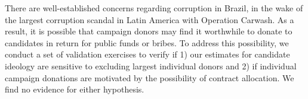 \documentclass[12pt,english]{article}
\newcommand{\lyxdot}{.}
\numberwithin{equation}{section}
\theoremstyle{plain}
\theoremstyle{remark}
\theoremstyle{plain}
\newcommand{\red}[1]{\textcolor{red}{#1}}
\begin{document}




There are well-established concerns regarding corruption in Brazil, in the wake of the largest corruption scandal in Latin America with Operation Carwash. As a result, it is possible that campaign donors may find it worthwhile to donate to candidates in return for public funds or bribes. To address this possibility, we conduct a set of validation exercises to verify if 1) our estimates for candidate ideology are sensitive to excluding largest individual donors and 2) if individual campaign donations are motivated by the possibility of contract allocation. We find no evidence for either hypothesis.

\end{document}
